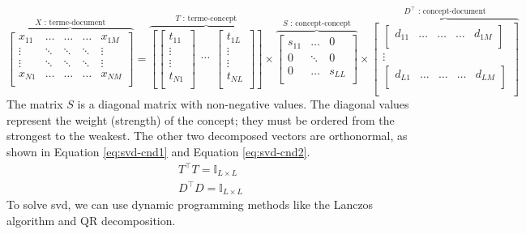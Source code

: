 \documentclass{KBook}
\begin{document}
\begin{equation}
\overbrace{
	\begin{bmatrix}
	x_{11} & \ldots & \ldots & \ldots & x_{1M} \\ 
	\vdots & \ddots & \ddots & \ddots &\vdots \\
	\vdots & \ddots & \ddots & \ddots &\vdots \\
	x_{N1} & \ldots & \ldots & \ldots & x_{NM} \\ 
	\end{bmatrix}
}^{X \text{ : terme-document}}
=
\overbrace{
	\left[
	\begin{bmatrix}
	t_{11} \\ 
	\vdots \\
	\vdots \\
	t_{N1} \\ 
	\end{bmatrix}
	\begin{matrix}
	\ldots \\ 
	\end{matrix}
	\begin{bmatrix}
	t_{1L} \\ 
	\vdots \\
	\vdots \\
	t_{NL} \\ 
	\end{bmatrix}
	\right]
}^{T \text{ : terme-concept}}
\times 
\overbrace{
	\begin{bmatrix}
	s_{11} & \ldots & 0 \\
	0 & \ddots & 0 \\
	0 & \ldots & s_{LL} \\
	\end{bmatrix}
}^{S \text{ : concept-concept}}
\times 
\overbrace{
	\begin{bmatrix}
	\begin{bmatrix}
	d_{11} & \ldots & \ldots & \ldots & d_{1M} \\
	\end{bmatrix}\\
	\vdots \\
	\begin{bmatrix}
	d_{L1} & \ldots & \ldots & \ldots & d_{LM} \\
	\end{bmatrix}\\
	\end{bmatrix}
}^{D^\top \text{ : concept-document}}
\label{eq:svd}
\end{equation}
The matrix $S$ is a diagonal matrix with non-negative values.
The diagonal values represent the weight (strength) of the concept; they must be ordered from the strongest to the weakest.
The other two decomposed vectors are orthonormal, as shown in Equation \ref{eq:svd-cnd1} and Equation \ref{eq:svd-cnd2}.
\begin{align}
T^\top T = \mathbb{I}_{L \times L} \label{eq:svd-cnd1} \\
D^\top D = \mathbb{I}_{L \times L} \label{eq:svd-cnd2}
\end{align}
To solve \ac{svd}, we can use dynamic programming methods like the Lanczos algorithm and QR decomposition.
\end{document}
